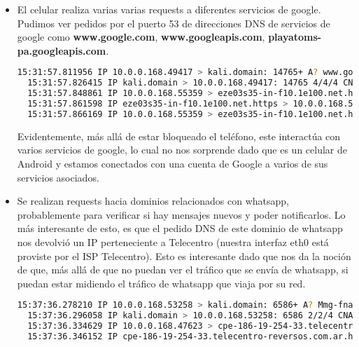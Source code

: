 \begin{itemize}

\item El celular realiza varias varias requests a diferentes servicios de google. Pudimos ver pedidos por el puerto 53 de direcciones DNS de 
servicios de google como \textbf{www.google.com}, \textbf{www.googleapis.com}, \textbf{playatoms-pa.googleapis.com}.

\begin{lstlisting}[language=bash]
  15:31:57.811956 IP 10.0.0.168.49417 > kali.domain: 14765+ A? www.googleapis.com. (36)
  15:31:57.826415 IP kali.domain > 10.0.0.168.49417: 14765 4/4/4 CNAME googleapis.l.google.com., A 172.217.30.138, A 172.217.30.170, A 172.217.28.202 (254)
  15:31:57.848861 IP 10.0.0.168.55359 > eze03s35-in-f10.1e100.net.https: Flags [S], seq 261817987, win 65535, options [mss 1460,sackOK,TS val 39032974 ecr 0,nop,wscale 8], length 0
  15:31:57.861598 IP eze03s35-in-f10.1e100.net.https > 10.0.0.168.55359: Flags [S.], seq 358949, ack 261817988, win 64240, options [mss 1460], length 0
  15:31:57.866169 IP 10.0.0.168.55359 > eze03s35-in-f10.1e100.net.https: Flags [.], ack 1, win 65535, length 0
\end{lstlisting}

Evidentemente, más allá de estar bloqueado el teléfono, este interactúa con varios servicios de google, lo cual no nos sorprende dado 
que es un celular de Android y estamos conectados con una cuenta de Google a varios de sus servicios asociados.

\item Se realizan requests hacia dominios relacionados con whatsapp, probablemente para verificar si hay mensajes nuevos y poder notificarlos. 
Lo más interesante de esto, es que el pedido DNS de este dominio de whatsapp nos devolvió un IP perteneciente a Telecentro (nuestra interfaz 
eth0 está proviste por el ISP Telecentro). Esto es interesante dado que nos da la noción de que, más allá de que no puedan ver el tráfico 
que se envía de whatsapp, si puedan estar midiendo el tráfico de whatsapp que viaja por su red.

\begin{lstlisting}[language=bash]
  15:37:36.278210 IP 10.0.0.168.53258 > kali.domain: 6586+ A? Mmg-fna.whatsapp.net. (38)
  15:37:36.296058 IP kali.domain > 10.0.0.168.53258: 6586 2/2/4 CNAME mmx-fb.cdn.whatsapp.net., A 186.19.254.33 (202)
  15:37:36.334629 IP 10.0.0.168.47623 > cpe-186-19-254-33.telecentro-reversos.com.ar.https: Flags [S], seq 3654449117, win 65535, options [mss 1460,sackOK,TS val 39044739 ecr 0,nop,wscale 8], length 0
  15:37:36.346152 IP cpe-186-19-254-33.telecentro-reversos.com.ar.https > 10.0.0.168.47623: Flags [S.], seq 189809644, ack 3654449118, win 64240, options [mss 1460], length 0
\end{lstlisting}


\end{itemize}
